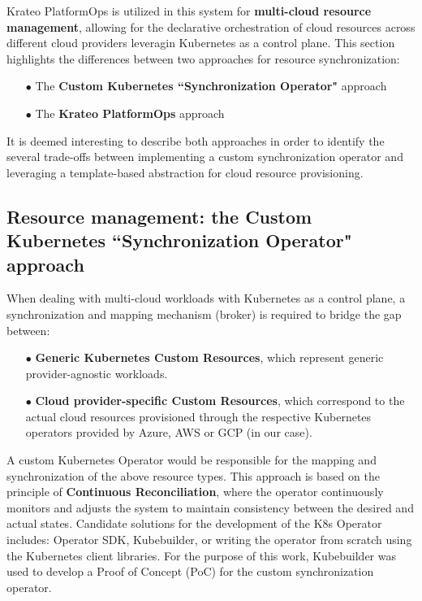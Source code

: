 Krateo PlatformOps is utilized in this system for \textbf{multi-cloud resource management}, allowing for the declarative orchestration of cloud resources across different cloud providers leveragin Kubernetes as a control plane. 
This section highlights the differences between two approaches for resource synchronization:
\begin{itemize}[itemsep=0.2pt, topsep=1pt]
  \item[$\bullet$] The \textbf{Custom Kubernetes ``Synchronization Operator"} approach
  \item[$\bullet$] The \textbf{Krateo PlatformOps} approach
\end{itemize}

It is deemed interesting to describe both approaches in order to identify the several trade-offs between implementing a custom synchronization operator and leveraging a template-based abstraction for cloud resource provisioning.

\subsection{Resource management: the Custom Kubernetes ``Synchronization Operator" approach}

When dealing with multi-cloud workloads with Kubernetes as a control plane, a synchronization and mapping mechanism (broker) is required to bridge the gap between:
\begin{itemize}[itemsep=0.2pt, topsep=1pt]
  \item[$\bullet$] \textbf{Generic Kubernetes Custom Resources}, which represent generic provider-agnostic workloads.
  \item[$\bullet$] \textbf{Cloud provider-specific Custom Resources}, which correspond to the actual cloud resources provisioned through the respective Kubernetes operators provided by Azure, AWS or GCP (in our case).
\end{itemize}

A custom Kubernetes Operator would be responsible for the mapping and synchronization of the above resource types. This approach is based on the principle of \textbf{Continuous Reconciliation}, where the operator continuously monitors and adjusts the system to maintain consistency between the desired and actual states.
Candidate solutions for the development of the K8s Operator includes: Operator SDK, Kubebuilder, or writing the operator from scratch using the Kubernetes client libraries. For the purpose of this work, Kubebuilder was used to develop a Proof of Concept (PoC) for the custom synchronization operator.

